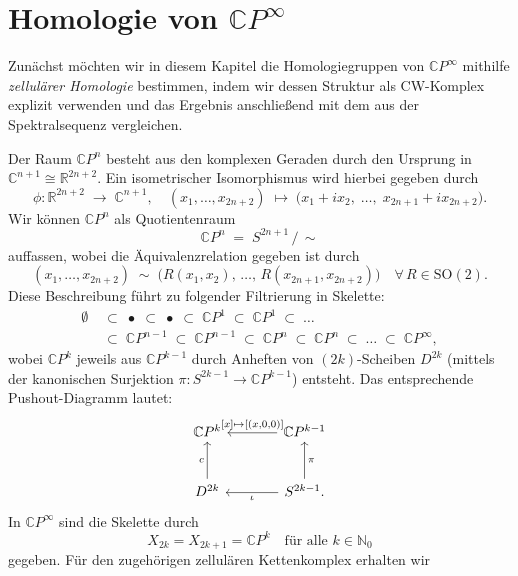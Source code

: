 \documentclass[12pt, hidelinks]{article}
\numberwithin{conj}{section}
\begin{document}
\section{Homologie von $\mathbb{C}P^\infty$}
\noindent
Zunächst möchten wir in diesem Kapitel die Homologiegruppen von \(\mathbb{C}P^\infty\) mithilfe \emph{zellulärer Homologie} bestimmen, indem wir dessen Struktur als CW-Komplex explizit verwenden und das Ergebnis anschließend mit dem aus der Spektralsequenz vergleichen. 

Der Raum \(\mathbb{C}P^n\) besteht aus den komplexen Geraden durch den Ursprung in \(\mathbb{C}^{n+1} \cong \mathbb{R}^{2n+2}\). Ein isometrischer Isomorphismus wird hierbei gegeben durch
\[
    \phi \colon \mathbb{R}^{2n+2} \;\longrightarrow\; \mathbb{C}^{n+1},
    \quad
    (x_1, \dots, x_{2n+2})
    \;\mapsto\;
    \bigl(x_1 + i x_2,\; \dots,\; x_{2n+1} + i x_{2n+2}\bigr).
\]
Wir können \(\mathbb{C}P^n\) als Quotientenraum
\[
    \mathbb{C}P^n \;=\; S^{2n+1} \,/\,\sim
\]
auffassen, wobei die Äquivalenzrelation gegeben ist durch
\[
    (x_1, \ldots, x_{2n+2})
    \;\sim\;
    \bigl(R(x_1,x_2),\,\dots,\,R(x_{2n+1},x_{2n+2})\bigr)
    \quad
    \forall\, R \in \mathrm{SO}(2).
\]
Diese Beschreibung führt zu folgender Filtrierung in Skelette:
\begin{align*}
    \emptyset
    &\;\subset\;
    \bullet
    \;\subset\;
    \bullet
    \;\subset\;
    \mathbb{C}P^1
    \;\subset\;
    \mathbb{C}P^1
    \;\subset\;
    \dots\\
    &\;\subset\;
    \mathbb{C}P^{n-1}
    \;\subset\;
    \mathbb{C}P^{n-1}
    \;\subset\;
    \mathbb{C}P^n
    \;\subset\;
    \mathbb{C}P^n
    \;\subset\;
    \dots
    \;\subset\;
    \mathbb{C}P^\infty,
\end{align*}
wobei \(\mathbb{C}P^k\) jeweils aus \(\mathbb{C}P^{k-1}\) durch Anheften von \((2k)\)-Scheiben \(D^{2k}\) (mittels der kanonischen Surjektion \(\pi \colon S^{2k-1} \to \mathbb{C}P^{k-1}\)) entsteht. Das entsprechende Pushout-Diagramm lautet:
\[\begin{tikzcd}[sep=large]
    {\mathbb{C}P^k} & {\mathbb{C}P^{k-1}} \\
    {D^{2k}} & {S^{2k-1}}.
    \arrow["{[x] \mapsto[(x,0,0)]}"', from=1-2, to=1-1]
    \arrow["c", from=2-1, to=1-1]
    \arrow["\pi"', from=2-2, to=1-2]
    \arrow["\iota", from=2-2, to=2-1]
\end{tikzcd}\]
In \(\mathbb{C}P^\infty\) sind die Skelette durch
\[
    X_{2k} = X_{2k+1} = \mathbb{C}P^k
    \quad
    \text{für alle } k \in \mathbb{N}_0
\]
gegeben. Für den zugehörigen zellulären Kettenkomplex erhalten wir
\end{document}
